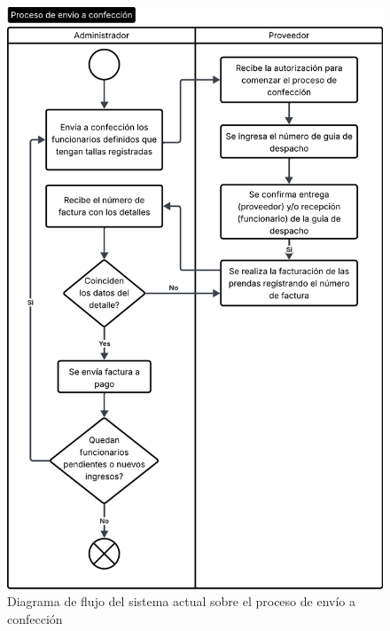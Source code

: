 \begin{figure}[htbp]
    \centering
    \includegraphics[height=0.9\textheight]{figuras/diagramas-actuales/diagrama-flujo-actual-envio-a-confeccion.png}
    \caption{Diagrama de flujo del sistema actual sobre el proceso de envío a confección}
    \label{fig:diagrama-flujo-actual-envio-a-confeccion}
\end{figure}

